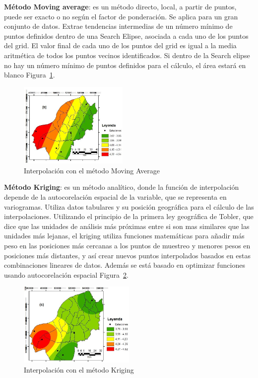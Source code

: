 \textbf{Método Moving average}: es un método directo, local, a partir de puntos, puede ser exacto
o no según el factor de ponderación. Se aplica para un gran conjunto de datos. Extrae
tendencias intermedias de un número mínimo de puntos definidos dentro de una Search
Elipse, asociada a cada uno de los puntos del grid. El valor final de cada uno de los puntos del
grid es igual a la media aritmética de todos los puntos vecinos identificados. Si dentro de la
Search elipse no hay un número mínimo de puntos definidos para el cálculo, el área estará en
blanco Figura~\ref{fig:m2}.
\begin{figure}[htb]
 \centering 
 \includegraphics[width=0.47\textwidth]{pictures/b.png}
 \caption{Interpolación con el método Moving Average\cite{models2013}}
 \label{fig:m2}
\end{figure}

\textbf{Método Kriging}: es un método analítico, donde la función de interpolación depende de la
autocorelación espacial de la variable, que se representa en variogramas. Utiliza datos
tabulares y su posición geográfica para el cálculo de las interpolaciones. Utilizando el
principio de la primera ley geográfica de Tobler, que dice que las unidades de análisis más
próximas entre si son mas similares que las unidades más lejanas, el kriging utiliza funciones
matemáticas para añadir más peso en las posiciones más cercanas a los puntos de muestreo y
menores pesos en posiciones más distantes, y así crear nuevos puntos interpolados basados en
estas combinaciones lineares de datos. Además se está basado en optimizar funciones usando
autocorelación espacial Figura~\ref{fig:m3}.
\begin{figure}[htb]
 \centering 
 \includegraphics[width=0.5\textwidth]{pictures/c.png}
 \caption{Interpolación con el método Kriging \cite{models2013}}
 \label{fig:m3}
\end{figure}

